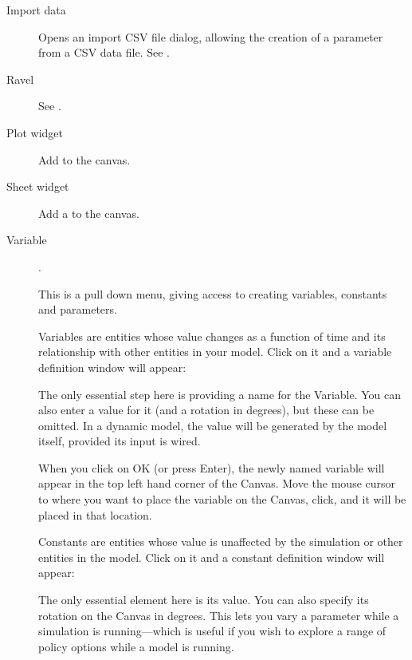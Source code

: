 \begin{description}
\item[Import data]  Opens an import CSV file dialog, allowing the
  creation of a parameter from a CSV data file. See
  .

\item[Ravel] See .
  
\item[Plot widget]  Add  to the canvas.

\item[Sheet widget]  Add a  to the canvas.

\item[Variable]  . \label{Variable}

This is a pull down menu, giving access to creating variables,
constants and parameters.

  Variables are entities
whose value changes as a function of time and its relationship with
other entities in your model. Click on it and a variable definition
window will appear:

\begin{center}
\end{center}

The only essential step here is providing a name for the Variable. You
can also enter a value for it (and a rotation in degrees), but these
can be omitted. In a dynamic model, the value will be generated by the
model itself, provided its input is wired.


When you click on OK (or press Enter), the newly named variable will
appear in the top left hand corner of the Canvas. Move the mouse
cursor to where you want to place the variable on the Canvas, click,
and it will be placed in that location.


Constants are entities whose
value is unaffected by the simulation or other entities in the
model. Click on it and a constant definition window will appear:

\begin{center}
\end{center}

The only essential element here is its
value. You can also specify its rotation on the Canvas in degrees. This lets you vary a
parameter while a simulation is running---which is useful if you wish
to explore a range of policy options while a model is running.


\end{description}
